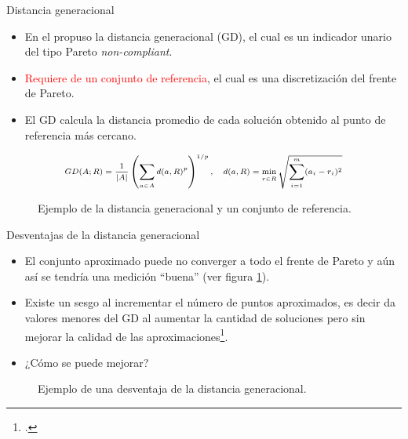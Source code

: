 \documentclass{beamer}
\begin{document}
\begin{frame}{Distancia generacional}
\begin{itemize}
\justifying
\scriptsize
\item En el \citeyear{Joel:GD} \citeauthor{Joel:GD} propuso la distancia generacional (GD), el cual es un indicador unario del tipo Pareto \textit{non-compliant}.
\item \textcolor{red}{Requiere de un conjunto de referencia}, el cual es una discretización del frente de Pareto.
\item El GD calcula la distancia promedio de cada solución obtenido al punto de referencia más cercano.
\end{itemize}
\begin{equation*}
\scriptsize
\begin{split}
GD(A; R) = \frac{1}{|A|} \left (   \sum_{a \in A} d(a, R)^p \right)^{1/p}, \quad d(a, R) = \min_{r \in R} \sqrt{\sum_{i=1}^m (a_i - r_i)^2}
\end{split}
\end{equation*}
\begin{figure}[H]
\centering

\caption{\scriptsize Ejemplo de la distancia generacional y un conjunto de referencia.} 
\end{figure}
\end{frame}


\begin{frame}{Desventajas de la distancia generacional}
\begin{itemize}
\justifying
\scriptsize
\item El conjunto aproximado puede no converger a todo el frente de Pareto y aún así se tendría una medición ``buena'' (ver figura \ref{fig:igd}).

\item Existe un sesgo al incrementar el número de puntos aproximados, es decir da valores menores del GD al aumentar la cantidad de soluciones pero sin mejorar la calidad de las aproximaciones\footcite{Joel:HausdorffDistance}.
\item ¿Cómo se puede mejorar?
\end{itemize}
\begin{figure}[H]
\centering

\caption{\scriptsize Ejemplo de una desventaja de la distancia generacional.} \label{fig:igd}
\end{figure}


\end{frame}
\end{document}
